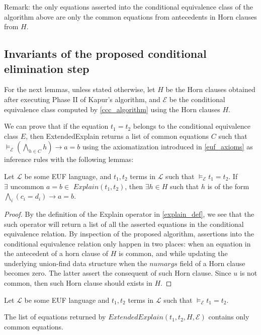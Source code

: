 Remark: the only equations asserted into the 
conditional equivalence class of the algorithm
above are only the common equations from 
antecedents in Horn clauses from $H$.

\subsection{Invariants of the proposed
conditional elimination step}

For the next lemmas, unless stated otherwise, let
$H$ be the Horn clauses obtained
after executing Phase II of Kapur's algorithm, and
$\mathcal{E}$ be the conditional equivalence class
computed by \ref{ccc_algorithm} using the Horn clauses
$H$.

We can prove that if the equation $t_1 = t_2$ belongs
to the conditional equivalence class $E$, 
then ExtendedExplain returns
a list of common equations $C$ such that
$\models_{\mathcal{E}} (\bigwedge_{h \in C} h) \rightarrow a = b$
using the axiomatization introduced in \ref{euf_axioms} as 
inference rules with the following lemmas:

\begin{lemma} \label{existence_horn_in_explain}
  Let $\mathcal{L}$ be some EUF language, 
  and $t_1, t_2$ terms in 
  $\mathcal{L}$ such that
  $\models_{\mathcal{E}} t_1 = t_2$.
  If $\exists \text{ uncommon } a = b \in$
  $Explain(t_1, t_2)$, then $\exists h \in H$ such 
  that $h$ is of the form 
  $\bigwedge_i (c_i = d_i) \rightarrow a = b$.
\end{lemma}

\begin{proof}
  By the definition of the Explain operator in \ref{explain_def},
  we see that the such operator will return a
  list of all the asserted equations in the conditional
  equivalence relation. By inspection of the proposed
  algorithm, assertions into the conditional equivalence
  relation only happen in two places: when an equation 
  in the antecedent of a horn clause of $H$ is common, 
  and while updating the underlying union-find data structure
  when the $numargs$ field of a Horn clause becomes
  zero. The latter assert the consequent of such Horn clause.
  Since $u$ is not common, then such Horn clause 
  should exists in $H$.
\end{proof}

\begin{lemma}\label{extended_explain_common_lemma}

  Let $\mathcal{L}$ be some EUF language 
  and $t_1, t_2$ terms in 
  $\mathcal{L}$ such that
  $\models_{\mathcal{E}} t_1 = t_2$.

  The list of equations returned by $ExtendedExplain(t_1, t_2, 
  H, \mathcal{E})$ contains only common equations.
\end{lemma}

